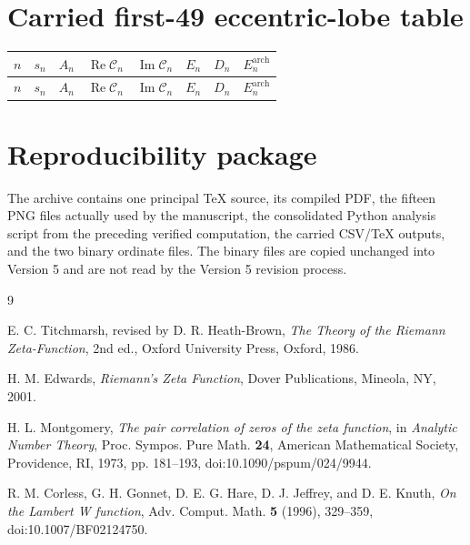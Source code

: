 \documentclass[11pt]{amsart}
\numberwithin{equation}{section}
\theoremstyle{definition}
\theoremstyle{remark}
\newcommand{\Ree}{\operatorname{Re}}
\newcommand{\Imm}{\operatorname{Im}}
\newcommand{\Ccal}{\mathcal C}
\begin{document}
\section{Carried first-49 eccentric-lobe table}
\label{sec:appendix-eccentric-table}

\scriptsize
\begin{longtable}{rrrrrrrr}
\toprule
$n$ & $s_n$ & $A_n$ & $\Ree\Ccal_n$ & $\Imm\Ccal_n$ & $E_n$ & $D_n$ & $E_n^{\mathrm{arch}}$\\
\midrule
\endfirsthead
\toprule
$n$ & $s_n$ & $A_n$ & $\Ree\Ccal_n$ & $\Imm\Ccal_n$ & $E_n$ & $D_n$ & $E_n^{\mathrm{arch}}$\\
\midrule
\endhead

\end{longtable}
\normalsize

\section{Reproducibility package}
\label{sec:appendix-reproducibility}

The archive contains one principal TeX source, its compiled PDF, the fifteen PNG files actually used by the manuscript, the consolidated Python analysis script from the preceding verified computation, the carried CSV/TeX outputs, and the two binary ordinate files.  The binary files are copied unchanged into Version 5 and are not read by the Version 5 revision process.

\begin{thebibliography}{9}

E. C. Titchmarsh, revised by D. R. Heath-Brown,
\emph{The Theory of the Riemann Zeta-Function}, 2nd ed.,
Oxford University Press, Oxford, 1986.

H. M. Edwards,
\emph{Riemann's Zeta Function},
Dover Publications, Mineola, NY, 2001.

H. L. Montgomery,
\emph{The pair correlation of zeros of the zeta function},
in \emph{Analytic Number Theory}, Proc. Sympos. Pure Math. \textbf{24},
American Mathematical Society, Providence, RI, 1973, pp. 181--193,
doi:10.1090/pspum/024/9944.

R. M. Corless, G. H. Gonnet, D. E. G. Hare, D. J. Jeffrey, and D. E. Knuth,
\emph{On the Lambert W function},
Adv. Comput. Math. \textbf{5} (1996), 329--359,
doi:10.1007/BF02124750.

\end{thebibliography}
\end{document}
